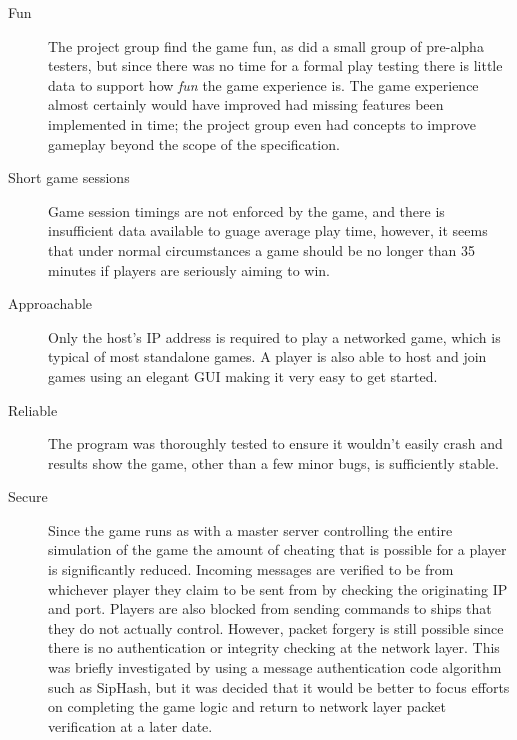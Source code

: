 \begin{description}
  \item[Fun] The project group find the game fun, as did a small group of pre-alpha testers, but since there was no time for a formal play testing there is little data to support how \emph{fun} the game experience is. The game experience almost certainly would have improved had missing features been implemented in time; the project group even had concepts to improve gameplay beyond the scope of the specification.
    
  \item[Short game sessions] Game session timings are not enforced by the game, and there is insufficient data available to guage average play time, however, it seems that under normal circumstances a game should be no longer than 35 minutes if players are seriously aiming to win.

  \item[Approachable] Only the host's IP address is required to play a networked game, which is typical of most standalone games. A player is also able to host and join games using an elegant GUI making it very easy to get started.

  \item[Reliable] The program was thoroughly tested to ensure it wouldn't easily crash and results show the game, other than a few minor bugs, is sufficiently stable.

  \item[Secure] Since the game runs as with a master server controlling the entire simulation of the game the amount of cheating that is possible for a player is significantly reduced. Incoming messages are verified to be from whichever player they claim to be sent from by checking the originating IP and port. Players are also blocked from sending commands to ships that they do not actually control. However, packet forgery is still possible since there is no authentication or integrity checking at the network layer. This was briefly investigated by using a message authentication code algorithm such as SipHash,\cite{aumasson2012siphash} but it was decided that it would be better to focus efforts on completing the game logic and return to network layer packet verification at a later date.

\end{description}
